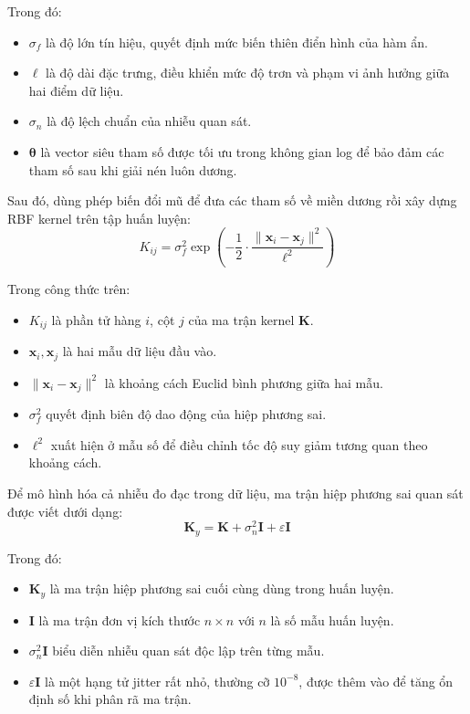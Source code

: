 Trong đó:
\begin{itemize}
    \item $\sigma_f$ là độ lớn tín hiệu, quyết định mức biến thiên điển hình của hàm ẩn.
    \item $\ell$ là độ dài đặc trưng, điều khiển mức độ trơn và phạm vi ảnh hưởng giữa hai điểm dữ liệu.
    \item $\sigma_n$ là độ lệch chuẩn của nhiễu quan sát.
    \item $\boldsymbol{\theta}$ là vector siêu tham số được tối ưu trong không gian log để bảo đảm các tham số sau khi giải nén luôn dương.
\end{itemize}

Sau đó, dùng phép biến đổi mũ để đưa các tham số về miền dương rồi xây dựng RBF kernel trên tập huấn luyện:
\begin{equation}
    K_{ij} = \sigma_f^2 \exp\!\left(-\frac{1}{2}\cdot\frac{\lVert \mathbf{x}_i - \mathbf{x}_j \rVert^2}{\ell^2}\right)
\end{equation}

Trong công thức trên:
\begin{itemize}
    \item $K_{ij}$ là phần tử hàng $i$, cột $j$ của ma trận kernel $\mathbf{K}$.
    \item $\mathbf{x}_i, \mathbf{x}_j$ là hai mẫu dữ liệu đầu vào.
    \item $\lVert \mathbf{x}_i - \mathbf{x}_j \rVert^2$ là khoảng cách Euclid bình phương giữa hai mẫu.
    \item $\sigma_f^2$ quyết định biên độ dao động của hiệp phương sai.
    \item $\ell^2$ xuất hiện ở mẫu số để điều chỉnh tốc độ suy giảm tương quan theo khoảng cách.
\end{itemize}

Để mô hình hóa cả nhiễu đo đạc trong dữ liệu, ma trận hiệp phương sai quan sát được viết dưới dạng:
\begin{equation}
    \mathbf{K}_y = \mathbf{K} + \sigma_n^2 \mathbf{I} + \varepsilon \mathbf{I}
\end{equation}

Trong đó:
\begin{itemize}
    \item $\mathbf{K}_y$ là ma trận hiệp phương sai cuối cùng dùng trong huấn luyện.
    \item $\mathbf{I}$ là ma trận đơn vị kích thước $n \times n$ với $n$ là số mẫu huấn luyện.
    \item $\sigma_n^2\mathbf{I}$ biểu diễn nhiễu quan sát độc lập trên từng mẫu.
    \item $\varepsilon\mathbf{I}$ là một hạng tử jitter rất nhỏ, thường cỡ $10^{-8}$, được thêm vào để tăng ổn định số khi phân rã ma trận.
\end{itemize}

